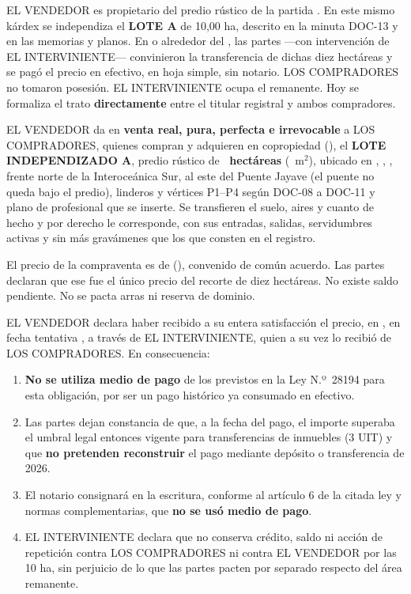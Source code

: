 \documentclass[12pt,a4paper]{article}
\begin{document}
EL VENDEDOR es propietario del predio rústico de la partida \PartidaMatriz. En este mismo kárdex se independiza el \textbf{LOTE A} de 10,00 ha, descrito en la minuta DOC-13 y en las memorias y planos. En o alrededor del \FechaPago, las partes ---con intervención de EL INTERVINIENTE--- convinieron la transferencia de dichas diez hectáreas y se pagó el precio en efectivo, en hoja simple, sin notario. LOS COMPRADORES no tomaron posesión. EL INTERVINIENTE ocupa el remanente. Hoy se formaliza el trato \textbf{directamente} entre el titular registral y ambos compradores.

EL VENDEDOR da en \textbf{venta real, pura, perfecta e irrevocable} a LOS COMPRADORES, quienes compran y adquieren en copropiedad (\PorcentajeCopropiedad), el \textbf{LOTE INDEPENDIZADO A}, predio rústico de \textbf{\AreaIndependizarHa\ hectáreas} (\AreaIndependizarMetros\ m$^2$), ubicado en \Distrito, \Provincia, \Departamento, frente norte de la Interoceánica Sur, al este del Puente Jayave (el puente no queda bajo el predio), linderos y vértices P1--P4 según DOC-08 a DOC-11 y plano de profesional que se inserte. Se transfieren el suelo, aires y cuanto de hecho y por derecho le corresponde, con sus entradas, salidas, servidumbres activas y sin más gravámenes que los que consten en el registro.

El precio de la compraventa es de \textbf{\MontoPago} (\textbf{\MontoPagoLetras}), convenido de común acuerdo. Las partes declaran que ese fue el único precio del recorte de diez hectáreas. No existe saldo pendiente. No se pacta arras ni reserva de dominio.

EL VENDEDOR declara haber recibido a su entera satisfacción el precio, en \textbf{\FormaPagoHistorica}, en fecha tentativa \FechaPago, a través de EL INTERVINIENTE, quien a su vez lo recibió de LOS COMPRADORES. En consecuencia:

\begin{enumerate}[leftmargin=1.15cm]
\item \textbf{No se utiliza medio de pago} de los previstos en la Ley N.º\ 28194 para esta obligación, por ser un pago histórico ya consumado en efectivo.
\item Las partes dejan constancia de que, a la fecha del pago, el importe superaba el umbral legal entonces vigente para transferencias de inmuebles (3 UIT) y que \textbf{no pretenden reconstruir} el pago mediante depósito o transferencia de 2026.
\item El notario consignará en la escritura, conforme al artículo 6 de la citada ley y normas complementarias, que \textbf{no se usó medio de pago}.
\item EL INTERVINIENTE declara que no conserva crédito, saldo ni acción de repetición contra LOS COMPRADORES ni contra EL VENDEDOR por las 10 ha, sin perjuicio de lo que las partes pacten por separado respecto del área remanente.
\end{enumerate}
\end{document}
